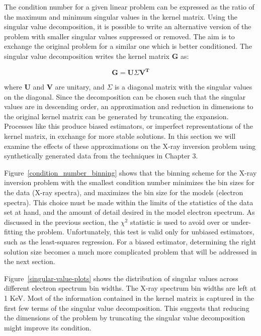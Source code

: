 The condition number for a given linear problem can be expressed as the ratio of the maximum and minimum singular values in the kernel matrix. Using the singular value decomposition, it is possible to write an alternative version of the problem with smaller singular values suppressed or removed. The aim is to exchange the original problem for a similar one which is better conditioned. The singular value decomposition writes the kernel matrix $\mathbf{G}$ as:

$$\mathbf{G} = \mathbf{U}\Sigma\mathbf{V^T}$$

where $\mathbf{U}$ and $\mathbf{V}$ are unitary, and $\Sigma$ is a diagonal matrix with the singular values on the diagonal. Since the decomposition can be chosen such that the singular values are in descending order, an approximation and reduction in dimensions to the original kernel matrix can be generated by truncating the expansion. Processes like this produce biased estimators, or imperfect representations of the kernel matrix, in exchange for more stable solutions. In this section we will examine the effects of these approximations on the X-ray inversion problem using synthetically generated data from the techniques in Chapter 3. 

Figure~\ref{condition_number_binning} shows that the binning scheme for the X-ray inversion problem with the smallest condition number minimizes the bin sizes for the data (X-ray spectra), and maximizes the bin size for the models (electron spectra). This choice must be made within the limits of the statistics of the data set at hand, and the amount of detail desired in the model electron spectrum. As discussed in the previous section, the $\chi^2$ statistic is used to avoid over or under-fitting the problem. Unfortunately, this test is valid only for unbiased estimators, such as the least-squares regression. For a biased estimator, determining the right solution size becomes a much more complicated problem that will be addressed in the next section.

Figure~\ref{singular-value-plots} shows the distribution of singular values across different electron spectrum bin widths. The X-ray spectrum bin widths are left at 1 KeV. Most of the information contained in the kernel matrix is captured in the first few terms of the singular value decomposition. This suggests that reducing the dimensions of the problem by truncating the singular value decomposition might improve its condition.

